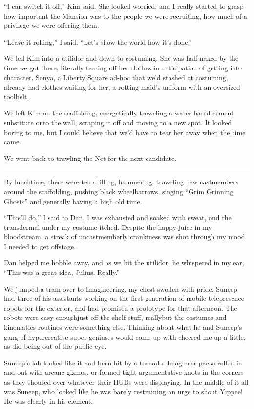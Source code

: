 “I can switch it off,” Kim said. She looked worried, and I really
started to grasp how important the Mansion was to the people we
were recruiting, how much of a privilege we were offering them.

“Leave it rolling,” I said. “Let's show the world how it's done.”

We led Kim into a utilidor and down to costuming. She was
half-naked by the time we got there, literally tearing off her
clothes in anticipation of getting into character. Sonya, a Liberty
Square ad-hoc that we'd stashed at costuming, already had clothes
waiting for her, a rotting maid's uniform with an oversized
toolbelt.

We left Kim on the scaffolding, energetically troweling a
water-based cement substitute onto the wall, scraping it off and
moving to a new spot. It looked boring to me, but I could believe
that we'd have to tear her away when the time came.

We went back to trawling the Net for the next candidate.

\begin{center}\rule{3in}{0.4pt}\end{center}

By lunchtime, there were ten drilling, hammering, troweling new
castmembers around the scaffolding, pushing black wheelbarrows,
singing “Grim Grinning Ghosts” and generally having a high old
time.

“This'll do,” I said to Dan. I was exhausted and soaked with sweat,
and the transdermal under my costume itched. Despite the
happy-juice in my bloodstream, a streak of uncastmemberly
crankiness was shot through my mood. I needed to get offstage.

Dan helped me hobble away, and as we hit the utilidor, he whispered
in my ear, “This was a great idea, Julius. Really.”

We jumped a tram over to Imagineering, my chest swollen with pride.
Suneep had three of his assistants working on the first generation
of mobile telepresence robots for the exterior, and had promised a
prototype for that afternoon. The robots were easy enough{\dash}just
off-the-shelf stuff, really{\dash}but the costumes and kinematics
routines were something else. Thinking about what he and Suneep's
gang of hypercreative super-geniuses would come up with cheered me
up a little, as did being out of the public eye.

Suneep's lab looked like it had been hit by a tornado. Imagineer
packs rolled in and out with arcane gizmos, or formed tight
argumentative knots in the corners as they shouted over whatever
their HUDs were displaying. In the middle of it all was Suneep, who
looked like he was barely restraining an urge to shout Yippee! He
was clearly in his element.

